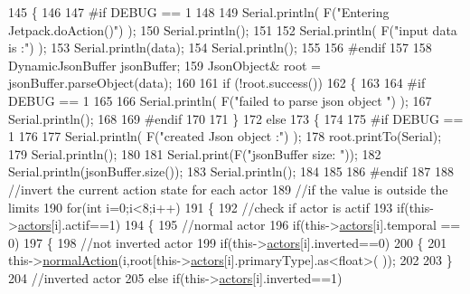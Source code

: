 \begin{DoxyCode}
145 \{
146 
147 \textcolor{preprocessor}{#if DEBUG == 1 }
148 
149     Serial.println( F(\textcolor{stringliteral}{"Entering Jetpack.doAction()"}) );
150     Serial.println();
151 
152     Serial.println( F(\textcolor{stringliteral}{"input data is :"}) );
153     Serial.println(data);
154     Serial.println();
155 
156 \textcolor{preprocessor}{#endif }
157 
158     DynamicJsonBuffer jsonBuffer;
159     JsonObject& root = jsonBuffer.parseObject(data);
160     
161     \textcolor{keywordflow}{if} (!root.success()) 
162     \{
163     
164 \textcolor{preprocessor}{    #if DEBUG == 1 }
165 
166         Serial.println( F(\textcolor{stringliteral}{"failed to parse json object "}) );
167         Serial.println();
168     
169 \textcolor{preprocessor}{    #endif }
170 
171     \}
172     \textcolor{keywordflow}{else}
173     \{
174     
175 \textcolor{preprocessor}{    #if DEBUG == 1 }
176 
177         Serial.println( F(\textcolor{stringliteral}{"created Json object :"}) );
178         root.printTo(Serial);
179         Serial.println();
180 
181         Serial.print(F(\textcolor{stringliteral}{"jsonBuffer size: "}));
182         Serial.println(jsonBuffer.size());
183         Serial.println();
184 
185     
186 \textcolor{preprocessor}{    #endif }
187 
188         \textcolor{comment}{//invert the current action state for each actor}
189         \textcolor{comment}{//if the value is outside the limits}
190         \textcolor{keywordflow}{for}(\textcolor{keywordtype}{int} i=0;i<8;i++)
191         \{
192             \textcolor{comment}{//check if actor is actif}
193             \textcolor{keywordflow}{if}(this->\hyperlink{class_jetpack_a7e16d2f97837f9712a2e6de1c50d99db}{actors}[i].actif==1)
194             \{
195                 \textcolor{comment}{//normal actor}
196                 \textcolor{keywordflow}{if}(this->\hyperlink{class_jetpack_a7e16d2f97837f9712a2e6de1c50d99db}{actors}[i].temporal == 0)
197                 \{
198                     \textcolor{comment}{//not inverted actor}
199                     \textcolor{keywordflow}{if}(this->\hyperlink{class_jetpack_a7e16d2f97837f9712a2e6de1c50d99db}{actors}[i].inverted==0)
200                     \{
201                         this->\hyperlink{class_jetpack_a65ce9533c39fa71e4945b970bf14b980}{normalAction}(i,root[this->\hyperlink{class_jetpack_a7e16d2f97837f9712a2e6de1c50d99db}{actors}[i].primaryType].as<float>(
      ));
202             
203                     \}
204                     \textcolor{comment}{//inverted actor}
205                     \textcolor{keywordflow}{else} \textcolor{keywordflow}{if}(this->\hyperlink{class_jetpack_a7e16d2f97837f9712a2e6de1c50d99db}{actors}[i].inverted==1)

\end{DoxyCode}

